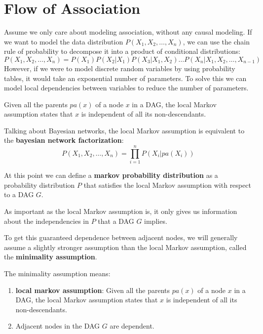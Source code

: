 \chapter{Flow of Association}
Assume we only care about modeling association, without any causal modeling. If
we want to model the data distribution $P(X_1, X_2, \ldots, X_n)$, we can use
the chain rule of probability to decompose it into a product of conditional
distributions:
\begin{equation}
    P(X_1, X_2, \ldots, X_n) = P(X_1)P(X_2|X_1)P(X_3|X_1, X_2)\ldots P(X_n|X_1, X_2, \ldots, X_{n-1})
\end{equation}
However, if we were to model discrete random variables by using probability
tables, it would take an exponential number of parameters. To solve this we
can model local dependencies between variables to reduce the number of
parameters.

\begin{definition}
    Given all the parents $pa(x)$ of a node $x$ in a DAG, the local Markov
    assumption states that $x$ is independent of all its non-descendants.
\end{definition}
Talking about Bayesian networks, the local Markov assumption is equivalent to
the \textbf{bayesian network factorization}:
\begin{equation}
    P(X_1, X_2, \ldots, X_n) = \prod_{i=1}^n P(X_i|pa(X_i))
\end{equation}

At this point we can define a \textbf{markov probability distribution} as a
probability distribution $P$ that satisfies the local Markov assumption with
respect to a DAG $G$.

As important as the local Markov assumption is, it only gives us information
about the independencies in $P$ that a DAG $G$ implies.

To get this guaranteed dependence between adjacent nodes, we will generally
assume a slightly stronger assumption than the local Markov assumption, called
the \textbf{minimality assumption}.
\begin{definition}
    The minimality assumption means:
    \begin{enumerate}
        \item \textbf{local markov assumption}: Given all the parents $pa(x)$ of
              a node $x$ in a DAG, the local Markov assumption states that $x$
              is independent of all its non-descendants.
        \item Adjacent nodes in the DAG $G$ are dependent.
    \end{enumerate}
\end{definition}

